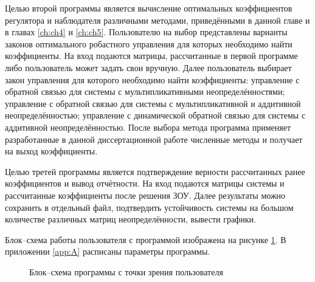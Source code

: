 Целью второй программы является вычисление оптимальных коэффициентов регулятора и наблюдателя различными методами, приведёнными в данной главе и в главах \ref{ch:ch4} и \ref{ch:ch5}. Пользователю на выбор представлены варианты законов оптимального робастного управления для которых необходимо найти коэффициенты. На вход подаются матрицы, рассчитанные в первой программе либо пользователь может задать свои вручную. Далее пользователь выбирает закон управления для которого необходимо найти коэффициенты: управление с обратной связью для системы с мультипликативными неопределённостями; управление с обратной связью для системы с мультипликативной и аддитивной неопределённостью; управление  с динамической обратной связью для системы с аддитивной неопределённостью. После выбора метода программа применяет разработанные в данной диссертационной работе численные методы и получает на выход коэффициенты.

Целью третей программы является подтверждение верности рассчитанных ранее коэффициентов и вывод отчётности. На вход подаются матрицы системы и рассчитанные коэффициенты после решения ЗОУ. Далее результаты можно сохранить в отдельный файл, подтвердить устойчивость системы на большом количестве различных матриц неопределённости, вывести графики.

Блок--схема работы пользователя с программой изображена на рисунке \ref{fig:block}. В приложении \ref{app:A} расписаны параметры программы.
\begin{figure}[ht]
	\caption{Блок--схема программы с точки зрения пользователя}\label{fig:block}
\end{figure} 
